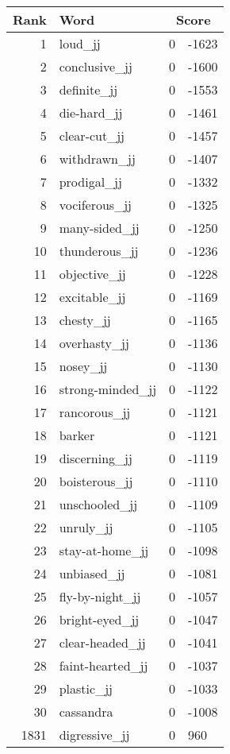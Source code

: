 \begin{longtable}[!htbp]{| rlr@{.}l |}
    \hline
    \textbf{Rank} & \textbf{Word} & \multicolumn{2}{c|}{\textbf{Score}} \\
    \hline
    \endhead
    1 & loud\_jj & 0 & -1623 \\
    2 & conclusive\_jj & 0 & -1600 \\
    3 & definite\_jj & 0 & -1553 \\
    4 & die-hard\_jj & 0 & -1461 \\
    5 & clear-cut\_jj & 0 & -1457 \\
    6 & withdrawn\_jj & 0 & -1407 \\
    7 & prodigal\_jj & 0 & -1332 \\
    8 & vociferous\_jj & 0 & -1325 \\
    9 & many-sided\_jj & 0 & -1250 \\
    10 & thunderous\_jj & 0 & -1236 \\
    11 & objective\_jj & 0 & -1228 \\
    12 & excitable\_jj & 0 & -1169 \\
    13 & chesty\_jj & 0 & -1165 \\
    14 & overhasty\_jj & 0 & -1136 \\
    15 & nosey\_jj & 0 & -1130 \\
    16 & strong-minded\_jj & 0 & -1122 \\
    17 & rancorous\_jj & 0 & -1121 \\
    18 & barker & 0 & -1121 \\
    19 & discerning\_jj & 0 & -1119 \\
    20 & boisterous\_jj & 0 & -1110 \\
    21 & unschooled\_jj & 0 & -1109 \\
    22 & unruly\_jj & 0 & -1105 \\
    23 & stay-at-home\_jj & 0 & -1098 \\
    24 & unbiased\_jj & 0 & -1081 \\
    25 & fly-by-night\_jj & 0 & -1057 \\
    26 & bright-eyed\_jj & 0 & -1047 \\
    27 & clear-headed\_jj & 0 & -1041 \\
    28 & faint-hearted\_jj & 0 & -1037 \\
    29 & plastic\_jj & 0 & -1033 \\
    30 & cassandra & 0 & -1008 \\
    1831 & digressive\_jj & 0 & 960 \\

\end{longtable}
